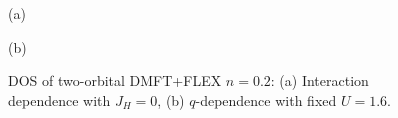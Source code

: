 \begin{figure}[h!]
\begin{minipage}[h]{0.5\linewidth}
 (a) \\
\end{minipage}
\hfill
\begin{minipage}[h]{0.5\linewidth}
 (b) \\
\end{minipage}
\caption{DOS of two-orbital DMFT+FLEX $n=0.2$: (a) Interaction dependence with $J_{H}=0$, (b) $q$-dependence with fixed $U=1.6$.}
\label{fig:2_orb_DOS_FLEX_mu_eq}
\end{figure}

